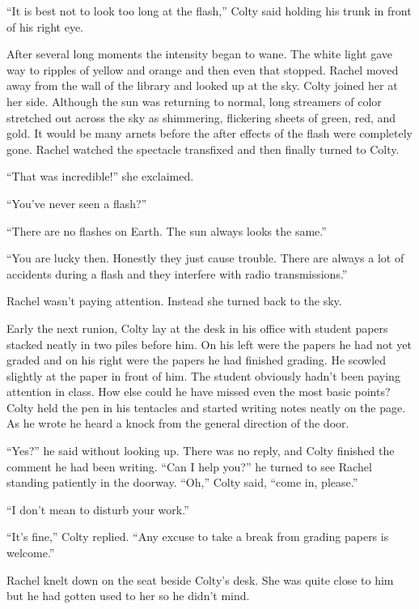 ``It is best not to look too long at the flash,'' Colty said holding his trunk in front of his
right eye.

After several long moments the intensity began to wane. The white light gave way to ripples of
yellow and orange and then even that stopped. Rachel moved away from the wall of the library and
looked up at the sky. Colty joined her at her side. Although the sun was returning to normal,
long streamers of color stretched out across the sky as shimmering, flickering sheets of green,
red, and gold. It would be many arnets before the after effects of the flash were completely
gone. Rachel watched the spectacle transfixed and then finally turned to Colty.

``That was incredible!'' she exclaimed.

``You've never seen a flash?''

``There are no flashes on Earth. The sun always looks the same.''

``You are lucky then. Honestly they just cause trouble. There are always a lot of accidents
during a flash and they interfere with radio transmissions.''

Rachel wasn't paying attention. Instead she turned back to the sky.

\spacebreak

Early the next runion, Colty lay at the desk in his office with student papers stacked neatly in
two piles before him. On his left were the papers he had not yet graded and on his right were
the papers he had finished grading. He scowled slightly at the paper in front of him. The
student obviously hadn't been paying attention in class. How else could he have missed even the
most basic points? Colty held the pen in his tentacles and started writing notes neatly on the
page. As he wrote he heard a knock from the general direction of the door.

``Yes?'' he said without looking up. There was no reply, and Colty finished the comment he had
been writing. ``Can I help you?'' he turned to see Rachel standing patiently in the doorway.
``Oh,'' Colty said, ``come in, please.''

``I don't mean to disturb your work.''

``It's fine,'' Colty replied. ``Any excuse to take a break from grading papers is welcome.''

Rachel knelt down on the seat beside Colty's desk. She was quite close to him but he had gotten
used to her so he didn't mind.

